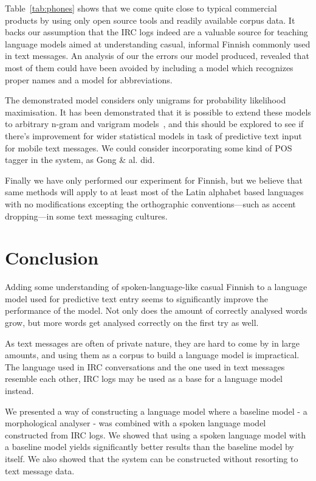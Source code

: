 \documentclass[a4paper,conference]{IEEEtran}
\begin{document}
Table~\ref{tab:phones} shows that we come quite close to typical
commercial products by using only open source tools and readily
available corpus data. It backs our assumption that the IRC logs
indeed are a valuable source for teaching language models aimed at
understanding casual, informal Finnish commonly used in text
messages. An analysis of our the errors our model produced, revealed
that most of them could have been avoided by including a model which
recognizes proper names and a model for abbreviations.

The demonstrated model considers only unigrams for probability
likelihood maximisation. It has been demonstrated that it is possible
to extend these models to arbitrary n-gram and varigram
models~\cite{Silfverberg/2011}, and this should be explored to see if
there's improvement for wider statistical models in task of predictive
text input for mobile text messages. We could consider incorporating
some kind of POS tagger in the system, as Gong \& al. \cite{gong/2008}
did.

Finally we have only performed our experiment for Finnish, but we
believe that same methods will apply to at least most of the Latin
alphabet based languages with no modifications excepting the
orthographic conventions---such as accent dropping---in some text messaging
cultures.

\section{Conclusion}
\label{sec:conclusions}
Adding some understanding of spoken-language-like casual Finnish to a
language model used for predictive text entry seems to significantly
improve the performance of the model. Not only does the amount of
correctly analysed words grow, but more words get analysed correctly
on the first try as well.

As text messages are often of private nature, they are hard to come by
in large amounts, and using them as a corpus to build a language model
is impractical. The language used in IRC conversations and the one
used in text messages resemble each other, IRC logs may be used as a
base for a language model instead.

We presented a way of constructing a language model where a baseline
model - a morphological analyser - was combined with a spoken language
model constructed from IRC logs. We showed that using a spoken
language model with a baseline model yields significantly better
results than the baseline model by itself. We also showed that the
system can be constructed without resorting to text message data.
\end{document}
